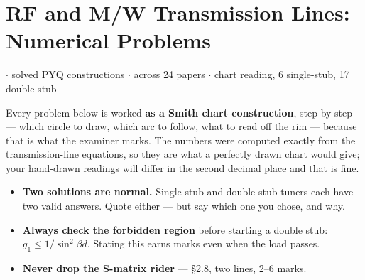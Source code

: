 \section{RF and M/W Transmission Lines: Numerical Problems}
{\color{sub}\footnotesize {} \gap$\cdot$ solved PYQ constructions \gap$\cdot$\gap
across 24 papers \gap$\cdot$ chart reading, 6 single-stub, 17 double-stub}

\vspace{3pt}\noindent
\colorbox{gdL}{\makebox[\dimexpr\textwidth-2\fboxsep][l]{%
  \textcolor{gd}{\bfseries\footnotesize READ THIS FIRST}}}
\par\nobreak\vspace{3pt}

Every problem below is worked \textbf{as a Smith chart construction}, step by step ---
which circle to draw, which arc to follow, what to read off the rim --- because that is
what the examiner marks. The numbers were computed exactly from the transmission-line
equations, so they are what a perfectly drawn chart would give; your hand-drawn readings
will differ in the second decimal place and that is fine.

\begin{itemize}
  \item \textbf{Two solutions are normal.} Single-stub and double-stub tuners each have
    two valid answers. Quote either --- but say which one you chose, and why.
  \item \textbf{Always check the forbidden region} before starting a double stub:
    $g_1 \le 1/\sin^2\beta d$. Stating this earns marks even when the load passes.
  \item \textbf{Never drop the S-matrix rider} --- \S2.8, two lines, 2--6 marks.
\end{itemize}

\hr



